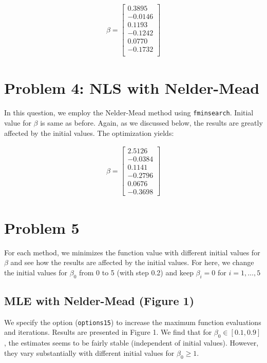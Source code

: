 \documentclass[11pt,letter]{article}
\newcounter{lem}[section] \setcounter{lem}{0}
\newcommand{\lprn}[1]{\left[{#1}\right]}
\newcommand{\code}[1]{\texttt{#1}}
\begin{document}
\begin{align*}
\beta = 
 \lprn{
\begin{array}{r}
0.3895 \\
-0.0146 \\
0.1193 \\
-0.1242 \\
0.0770 \\
-0.1732 \\
\end{array}
}
\end{align*}


\section*{Problem 4: NLS with Nelder-Mead}

In this question, we employ the Nelder-Mead method using \code{fminsearch}. Initial value for $\beta$ is same as before. Again, as we discussed below, the results are greatly affected by the initial values. The optimization yields:

\begin{align*}
\beta = 
 \lprn{
\begin{array}{r}
2.5126 \\
-0.0384 \\
0.1141 \\
-0.2796 \\
0.0676 \\
-0.3698
\end{array}
}
\end{align*}



\section*{Problem 5}

For each method, we minimizes the function value with different initial values for $\beta$ and see how the results are affected by the initial values. For here, we change the initial values for $\beta_0$ from 0 to 5 (with step 0.2) and keep $\beta_i = 0$ for $i=1,...,5$

\subsection*{MLE with Nelder-Mead (Figure 1)}
We specify the option (\code{options15}) to increase the maximum function evaluations and iterations. Results are presented in Figure 1. We find that for $\beta_0\in[0.1,0.9]$, the estimates seems to be fairly stable (independent of initial values). However, they vary substantially with different initial values for $\beta_0\geq 1$. 
\end{document}
